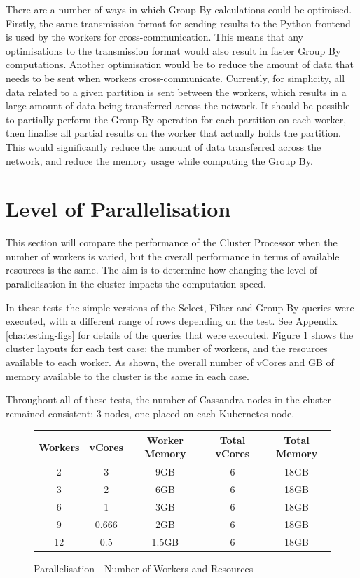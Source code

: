 There are a number of ways in which Group By calculations could be optimised. Firstly, the same transmission format for sending results to the Python frontend is used by the workers for cross-communication. This means that any optimisations to the transmission format would also result in faster Group By computations. Another optimisation would be to reduce the amount of data that needs to be sent when workers cross-communicate. Currently, for simplicity, all data related to a given partition is sent between the workers, which results in a large amount of data being transferred across the network. It should be possible to partially perform the Group By operation for each partition on each worker, then finalise all partial results on the worker that actually holds the partition. This would significantly reduce the amount of data transferred across the network, and reduce the memory usage while computing the Group By.

\section{Level of Parallelisation}
This section will compare the performance of the Cluster Processor when the number of workers is varied, but the overall performance in terms of available resources is the same. The aim is to determine how changing the level of parallelisation in the cluster impacts the computation speed. 

In these tests the simple versions of the Select, Filter and Group By queries were executed, with a different range of rows depending on the test. See Appendix \ref{cha:testing-figs} for details of the queries that were executed. Figure \ref{fig:parallelisation-test-workers} shows the cluster layouts for each test case; the number of workers, and the resources available to each worker. As shown, the overall number of vCores and GB of memory available to the cluster is the same in each case.

Throughout all of these tests, the number of Cassandra nodes in the cluster remained consistent: 3 nodes, one placed on each Kubernetes node.

\begin{figure}[ht]
	\centering
	\begin{tabular}{| c | c | c | c | c |}
		\hline
		\textbf{Workers} & \textbf{vCores} & \textbf{Worker Memory} & \textbf{Total vCores} & \textbf{Total Memory} \\ \hline
		2 & 3 & 9GB & 6 & 18GB \\ \hline
		3 & 2 & 6GB & 6 & 18GB \\ \hline
		6 & 1 & 3GB & 6 & 18GB \\ \hline
		9 & 0.666 & 2GB & 6 & 18GB \\ \hline
		12 & 0.5 & 1.5GB & 6 & 18GB \\ \hline
	\end{tabular}
	\caption{Parallelisation - Number of Workers and Resources}
	\label{fig:parallelisation-test-workers}
\end{figure}

